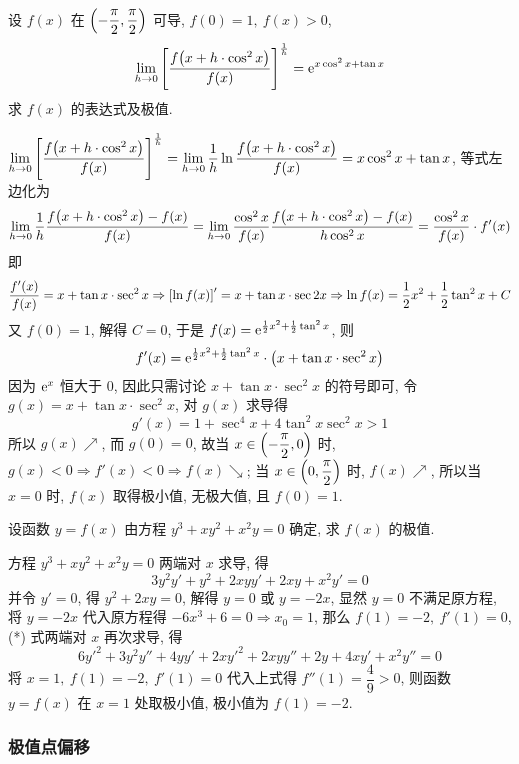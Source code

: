 \begin{example}
    设 $f(x)$ 在 $\qty(-\dfrac{\pi}{2},\dfrac{\pi}{2})$ 可导, $f(0)=1,~f(x)>0$, $$\displaystyle\lim_{h\to0}\qty[\dfrac{f\qty(x+h\cdot \cos^2x)}{f(x)}]^{\frac{1}{h}}=\mathrm{e}^{x\cos^2x+\tan x}$$
    求 $f(x)$ 的表达式及极值.
\end{example}
\begin{solution}
    $\displaystyle\lim_{h\to0}\qty[\dfrac{f\qty(x+h\cdot \cos^2x)}{f(x)}]^{\frac{1}{h}}=\lim_{h\to0}\dfrac{1}{h}\ln\dfrac{f\qty(x+h\cdot\cos^2x)}{f(x)}=x\cos^2x+\tan x$, 
    等式左边化为 $$\lim_{h\to0}\dfrac{1}{h}\dfrac{f\qty(x+h\cdot\cos^2x)-f(x)}{f(x)}=\lim_{h\to0}\dfrac{\cos^2x}{f(x)}\dfrac{f\qty(x+h\cdot\cos^2x)-f(x)}{h\cos^2x}=\dfrac{\cos^2x}{f(x)}\cdot f'(x)$$
    即 $$\dfrac{f'(x)}{f(x)}=x+\tan x\cdot\sec^2x\Rightarrow \qty[\ln f(x)]'=x+\tan x\cdot\sec2x\Rightarrow \ln f(x)=\dfrac{1}{2}x^2+\dfrac{1}{2}\tan^2x+C$$
    又 $f(0)=1$, 解得 $C=0$, 于是
    $f(x)=\mathrm{e}^{\frac{1}{2}x^2+\frac{1}{2}\tan^2x}$, 则
    $$f'(x)=\mathrm{e}^{\frac{1}{2}x^2+\frac{1}{2}\tan^2x}\cdot\qty(x+\tan x\cdot\sec^2x)$$
    因为 $\mathrm{e}^{x}$ 恒大于 0, 因此只需讨论 $x+\tan x\cdot\sec^2x$ 的符号即可, 令 $g(x)=x+\tan x\cdot\sec^2x$, 对 $g(x)$ 求导得 $$g'(x)=1+\sec^4x+4\tan^2x\sec^2x>1$$
    所以 $g(x)\nearrow$, 而 $g(0)=0$, 故当 $x\in\qty(-\dfrac{\pi}{2},0)$ 时, $g(x)<0\Rightarrow f'(x)<0\Rightarrow f(x)\searrow$; 当 $x\in\qty(0,\dfrac{\pi}{2})$ 时, $f(x)\nearrow$, 
    所以当 $x=0$ 时, $f(x)$ 取得极小值, 无极大值, 且 $f(0)=1.$
\end{solution}

\begin{example}[2014 数一]
    设函数 $y=f(x)$ 由方程 $y^3+xy^2+x^2y=0$ 确定, 求 $f(x)$ 的极值.
\end{example}
\begin{solution}
    方程 $y^3+xy^2+x^2y=0$ 两端对 $x$ 求导, 得 
    \begin{equation*}
        3y^2y'+y^2+2xyy'+2xy+x^2y'=0
        \tag{*}
    \end{equation*}
    并令 $y'=0$, 得 $y^2+2xy=0$, 解得 $y=0$ 或 $y=-2x$, 
    显然 $y=0$ 不满足原方程, 将 $y=-2x$ 代入原方程得 $-6x^3+6=0\Rightarrow x_0=1$, 那么 $f(1)=-2,~f'(1)=0$, (*) 式两端对 $x$ 再次求导, 得 
    $$6y'^2+3y^2y''+4yy'+2xy'^2+2xyy''+2y+4xy'+x^2y''=0$$
    将 $x=1,~f(1)=-2,~f'(1)=0$ 代入上式得 $f''(1)=\dfrac{4}{9}>0$, 
    则函数 $y=f(x)$ 在 $x=1$ 处取极小值, 极小值为 $f(1)=-2.$
\end{solution}

\subsubsection{极值点偏移}

